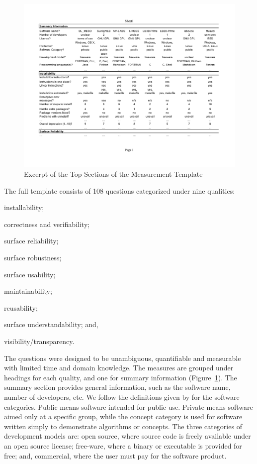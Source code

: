 \documentclass[final, 3p, times, authoryear]{elsarticle}
\begin{document}
\begin{figure}[!ht]
	\begin{center}
	  \includegraphics[width=1.0\textwidth]{./figures/measurement_template.pdf}
	  \caption{Excerpt of the Top Sections of the Measurement Template}
	  \label{measurement_template_image}
	\end{center}
\end{figure}

The full template consists of 108 questions categorized under nine qualities:
\begin{inparaenum}[(i)]
	\item installability;
	\item correctness and verifiability;
	\item surface reliability;
	\item surface robustness;
	\item surface usability;
	\item maintainability;
	\item reusability;
	\item surface understandability; and,
	\item visibility/transparency. 
\end{inparaenum} 

The questions were designed to be unambiguous, quantifiable and measurable with
limited time and domain knowledge. The measures are grouped under headings for
each quality, and one for summary information
(Figure~\ref{measurement_template_image}). The summary section provides general
information, such as the software name, number of developers, etc.  We follow
the definitions given by \citet{gewaltig2012quality} for the software
categories.  Public means software intended for public use.  Private means
software aimed only at a specific group, while the concept category is used for
software written simply to demonstrate algorithms or concepts. The three
categories of development models are: open source, where source code is freely
available under an open source license; free-ware, where a binary or executable
is provided for free; and, commercial, where the user must pay for the software
product.  
\end{document}

